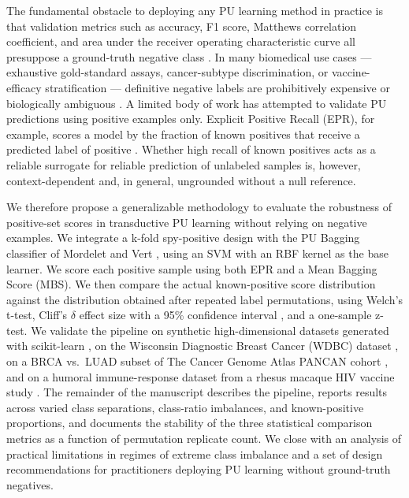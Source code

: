 \documentclass[11pt]{article}
\begin{document}
The fundamental obstacle to deploying any PU learning method in practice is that validation metrics such as accuracy, F1 score, Matthews correlation coefficient, and area under the receiver operating characteristic curve all presuppose a ground-truth negative class \cite{hanley1982auc}. In many biomedical use cases --- exhaustive gold-standard assays, cancer-subtype discrimination, or vaccine-efficacy stratification --- definitive negative labels are prohibitively expensive or biologically ambiguous \cite{yang2014epu,wang2019nsemda}. A limited body of work has attempted to validate PU predictions using positive examples only. Explicit Positive Recall (EPR), for example, scores a model by the fraction of known positives that receive a predicted label of positive \cite{cheng2015epr}. Whether high recall of known positives acts as a reliable surrogate for reliable prediction of unlabeled samples is, however, context-dependent and, in general, ungrounded without a null reference.

We therefore propose a generalizable methodology to evaluate the robustness of positive-set scores in transductive PU learning without relying on negative examples. We integrate a k-fold spy-positive design \cite{liu2003spy} with the PU Bagging classifier of Mordelet and Vert \cite{mordelet2014bagging}, using an SVM with an RBF kernel \cite{pedregosa2011scikit} as the base learner. We score each positive sample using both EPR \cite{cheng2015epr} and a Mean Bagging Score (MBS). We then compare the actual known-positive score distribution against the distribution obtained after repeated label permutations, using Welch's t-test, Cliff's $\delta$ effect size with a 95\% confidence interval \cite{cliff1993dominance}, and a one-sample z-test. We validate the pipeline on synthetic high-dimensional datasets generated with scikit-learn \cite{pedregosa2011scikit,abraham2014scikit}, on the Wisconsin Diagnostic Breast Cancer (WDBC) dataset \cite{wolberg1999nuclear,wolberg2002computer}, on a BRCA vs.\ LUAD subset of The Cancer Genome Atlas PANCAN cohort \cite{weinstein2013tcga}, and on a humoral immune-response dataset from a rhesus macaque HIV vaccine study \cite{lakhashe2022virosomal,marasini2021enshivig,malherbe2021adenovirus}. The remainder of the manuscript describes the pipeline, reports results across varied class separations, class-ratio imbalances, and known-positive proportions, and documents the stability of the three statistical comparison metrics as a function of permutation replicate count. We close with an analysis of practical limitations in regimes of extreme class imbalance and a set of design recommendations for practitioners deploying PU learning without ground-truth negatives.
\end{document}
